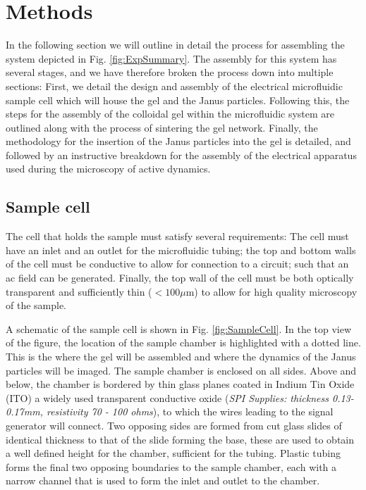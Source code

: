 \section{Methods}
\label{section:expSystem:Methods}

In the following section we will outline in detail the process for assembling the system depicted in Fig. \ref{fig:ExpSummary}. The assembly for this system  has several stages, and we have therefore broken the process down into multiple sections: First, we detail the design and assembly of the electrical microfluidic sample cell which will house the gel and the Janus particles. Following this, the steps for the assembly of the colloidal gel within the microfluidic system are outlined along with the process of sintering the gel network. Finally, the methodology for the insertion of the Janus particles into the gel is detailed, and followed by an instructive breakdown for the assembly of the electrical apparatus used during the microscopy of active dynamics.

\subsection{Sample cell}
\label{section:SampleCell}

The cell that holds the sample must satisfy several requirements: The cell must have an inlet and an outlet for the microfluidic tubing; the top and bottom walls of the cell must be conductive to allow for connection to a circuit; such that an ac field can be generated. Finally, the top wall of the cell must be both optically transparent and sufficiently thin ($<100\mu$m) to allow for high quality microscopy of the sample. 


A schematic of the sample cell is shown in Fig. \ref{fig:SampleCell}. In the  top view of the figure, the location of the sample chamber is highlighted with a dotted line. This is the where the gel will be assembled and where the dynamics of the Janus particles will be imaged. The sample chamber is enclosed on all sides. Above and below, the chamber is bordered by thin glass planes coated in Indium Tin Oxide (ITO) a widely used transparent conductive oxide (\textit{SPI Supplies: thickness 0.13-0.17mm, resistivity 70 - 100 ohms}), to which the wires leading to the signal generator will connect. Two opposing sides are formed from cut glass slides of identical thickness to that of the slide forming the base, these are used to obtain a well defined height for the chamber, sufficient for the tubing. Plastic tubing forms the final two opposing boundaries to the sample chamber, each with a narrow channel that is used to form the inlet and outlet to the chamber. 


